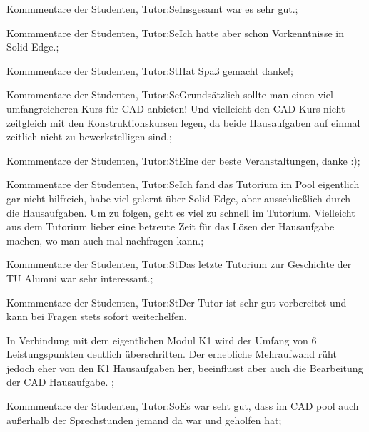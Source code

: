 \documentclass[10pt]{beamer}
\begin{document}
\begin{frame}[fragile]{Kommmentare der Studenten, Tutor:Se}Insgesamt war es sehr gut.;
 \end{frame}
\begin{frame}[fragile]{Kommmentare der Studenten, Tutor:Se}Ich hatte aber schon Vorkenntnisse in Solid Edge.;
 \end{frame}
\begin{frame}[fragile]{Kommmentare der Studenten, Tutor:St}Hat Spaß gemacht danke!;
 \end{frame}
\begin{frame}[fragile]{Kommmentare der Studenten, Tutor:Se}Grundsätzlich sollte man einen viel umfangreicheren Kurs für CAD anbieten!  Und vielleicht den CAD Kurs nicht zeitgleich mit den Konstruktionskursen legen, da beide Hausaufgaben auf einmal zeitlich nicht zu bewerkstelligen sind.;
 \end{frame}
\begin{frame}[fragile]{Kommmentare der Studenten, Tutor:St}Eine der beste Veranstaltungen, danke :);
 \end{frame}
\begin{frame}[fragile]{Kommmentare der Studenten, Tutor:Se}Ich fand das Tutorium im Pool eigentlich gar nicht hilfreich, habe viel gelernt über Solid Edge, aber ausschließlich durch die Hausaufgaben. Um zu folgen, geht es viel zu schnell im Tutorium. Vielleicht aus dem Tutorium lieber eine betreute Zeit für das Lösen der Hausaufgabe machen, wo man auch mal nachfragen kann.;
 \end{frame}
\begin{frame}[fragile]{Kommmentare der Studenten, Tutor:St}Das letzte Tutorium zur Geschichte der TU Alumni war sehr interessant.;
 \end{frame}
\begin{frame}[fragile]{Kommmentare der Studenten, Tutor:St}Der Tutor ist sehr gut vorbereitet und kann bei Fragen stets sofort weiterhelfen. 
 
 In Verbindung mit dem eigentlichen Modul K1 wird der Umfang von 6 Leistungspunkten deutlich überschritten. Der erhebliche Mehraufwand rüht jedoch eher von den K1 Hausaufgaben her, beeinflusst aber auch die Bearbeitung der CAD Hausaufgabe. ;
 \end{frame}
\begin{frame}[fragile]{Kommmentare der Studenten, Tutor:So}Es war seht gut, dass im CAD pool auch außerhalb der Sprechstunden jemand da war und geholfen hat;
 \end{frame}
\end{document}
